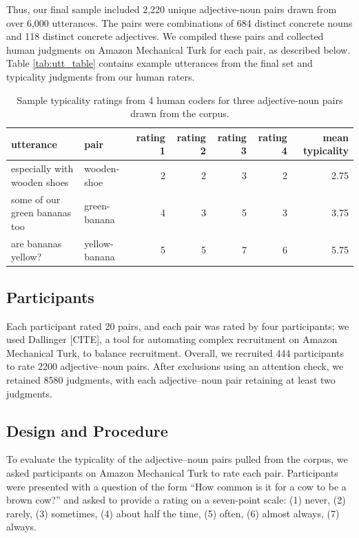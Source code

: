\documentclass[10pt, letterpaper]{article}
\begin{document}
Thus, our final sample included 2,220 unique adjective-noun pairs drawn
from over 6,000 utterances. The pairs were combinations of 684 distinct
concrete nouns and 118 distinct concrete adjectives. We compiled these
pairs and collected human judgments on Amazon Mechanical Turk for each
pair, as described below. Table \ref{tab:utt_table} contains example
utterances from the final set and typicality judgments from our human
raters.

\begin{table}[tb]
\centering
\begin{tabular}{llrrrrr}
  \hline
utterance & pair & rating 1 & rating 2 & rating 3 & rating 4 & mean typicality \\ 
  \hline
especially with wooden shoes & wooden-shoe &   2 &   2 &   3 &   2 & 2.75 \\ 
  some of our green bananas too & green-banana &   4 &   3 &   5 &   3 & 3.75 \\ 
  are bananas yellow? & yellow-banana &   5 &   5 &   7 &   6 & 5.75 \\ 
   \hline
\end{tabular}
\caption{Sample typicality ratings from 4 human coders for three adjective-noun pairs drawn from the corpus.} 
\end{table}

\hypertarget{participants}{%
\subsection{Participants}\label{participants}}

Each participant rated 20 pairs, and each pair was rated by four
participants; we used Dallinger {[}CITE{]}, a tool for automating
complex recruitment on Amazon Mechanical Turk, to balance recruitment.
Overall, we recruited 444 participants to rate 2200 adjective--noun
pairs. After exclusions using an attention check, we retained 8580
judgments, with each adjective--noun pair retaining at least two
judgments.

\hypertarget{design-and-procedure}{%
\subsection{Design and Procedure}\label{design-and-procedure}}

To evaluate the typicality of the adjective--noun pairs pulled from the
corpus, we asked participants on Amazon Mechanical Turk to rate each
pair. Participants were presented with a question of the form ``How
common is it for a cow to be a brown cow?'' and asked to provide a
rating on a seven-point scale: (1) never, (2) rarely, (3) sometimes, (4)
about half the time, (5) often, (6) almost always, (7) always.
\end{document}
